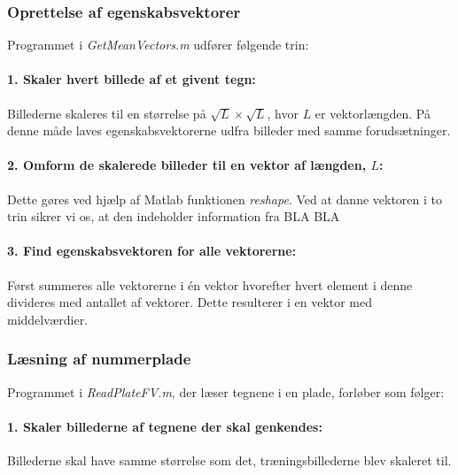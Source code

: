 \subsubsection*{Oprettelse af egenskabsvektorer}

Programmet i \textit{GetMeanVectors.m} udfører følgende trin:

\paragraph{1. Skaler hvert billede af et givent tegn:} Billederne skaleres til en størrelse på $\sqrt{L} \times \sqrt{L}$, hvor $L$ er vektorlængden. På denne måde laves egenskabsvektorerne udfra billeder med samme forudsætninger.

\paragraph{2. Omform de skalerede billeder til en vektor af længden, $L$:} Dette gøres ved hjælp af Matlab funktionen \textit{reshape}. Ved at danne vektoren i to trin sikrer vi os, at den indeholder information fra  BLA BLA

\paragraph{3. Find egenskabsvektoren for alle vektorerne:} Først summeres alle vektorerne i én vektor hvorefter hvert element i denne divideres med antallet af vektorer. Dette resulterer i en vektor med middelværdier.



\subsubsection*{Læsning af nummerplade}

Programmet i \textit{ReadPlateFV.m}, der læser tegnene i en plade, forløber som følger:

\paragraph{1. Skaler billederne af tegnene der skal genkendes:} Billederne skal have samme størrelse som det, træningsbillederne blev skaleret til.

